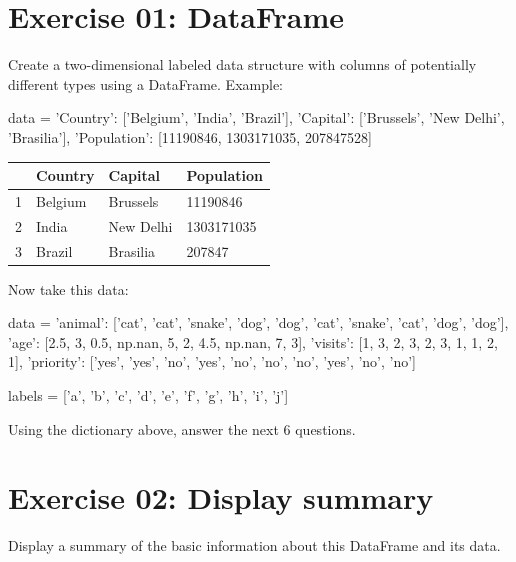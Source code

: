 \documentclass{42-en}
\begin{document}
\chapter{Exercise 01: DataFrame}
\makeheaderfiles

\vspace{1em}
Create a two-dimensional labeled data structure with columns of potentially different types using a DataFrame. \linebreak
Example:\\
\begin{42console}
data = {'Country': ['Belgium', 'India', 'Brazil'],
'Capital': ['Brussels', 'New Delhi', 'Brasilia'],
'Population': [11190846, 1303171035, 207847528]}
\end{42console}
\linebreak
\begin{table}[!ht]
\centering
\begin{tabular}{|l|l|l|l|}
\hline
  & Country & Capital   & Population \\ \hline
1 & Belgium & Brussels  & 11190846   \\ \hline
2 & India   & New Delhi & 1303171035 \\ \hline
3 & Brazil  & Brasilia  & 207847     \\ \hline
\end{tabular}
\end{table}
\linebreak
Now take this data:\\
\begin{42console}
data = {'animal': ['cat', 'cat', 'snake', 'dog', 'dog', 'cat', 'snake', 'cat', 'dog', 'dog'],
    'age': [2.5, 3, 0.5, np.nan, 5, 2, 4.5, np.nan, 7, 3],
    'visits': [1, 3, 2, 3, 2, 3, 1, 1, 2, 1],
    'priority': ['yes', 'yes', 'no', 'yes', 'no', 'no', 'no', 'yes', 'no', 'no']}
    
labels = ['a', 'b', 'c', 'd', 'e', 'f', 'g', 'h', 'i', 'j']
\end{42console}
Using the dictionary above, answer the next 6 questions.
\nextexercice
\newpage




\chapter{Exercise 02: Display summary}

\makeheaderfiles
Display a summary of the basic information about this DataFrame and its data.\\
\nextexercice
\newpage
\end{document}
